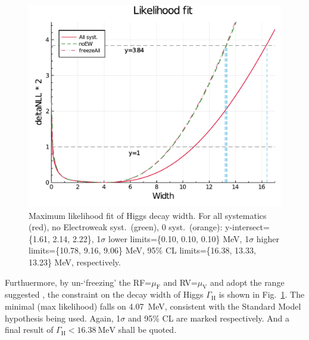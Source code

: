 \begin{figure}[h]
    \centering
    \includegraphics[width=.6\linewidth]{fig/Final_fit_width.pdf}
    \caption{Maximum likelihood fit of Higgs decay width. For all systematics (red), no Electroweak syst.~(green),
    0 syst.~(orange): y-intersect=\{1.61, 2.14, 2.22\}, 1$\sigma$ lower limits=\{0.10, 0.10, 0.10\} MeV,
1$\sigma$ higher limits=\{10.78, 9.16, 9.06\} MeV, 95\% CL limits=\{16.38, 13.33, 13.23\} MeV, respectively.}
\label{fig:final_fit_width}
\end{figure}
Furthuermore, by un-`freezing' the RF=$\mu_\mathrm{F}$ and RV=$\mu_\mathrm{V}$ and adopt the range suggested
\cite{rfrv_higgs_pas}, the constraint on the decay width of Higgs $\Gamma_\mathrm{H}$ is shown in 
Fig.~\ref{fig:final_fit_width}. The minimal (max likelihood) falls on \SI{4.07}{\mega\electronvolt},
consistent with the Standard Model hypothesis being used. 
Again, 1$\sigma$ and 95\% CL are marked respectively. And a final result of 
$\Gamma_\mathrm{H}<\SI{16.38}{\mega\electronvolt}$ shall be quoted.




